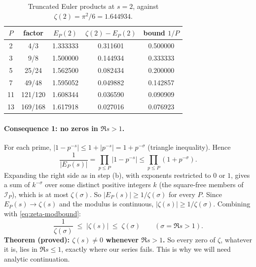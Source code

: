 \begin{table}[htbp]\centering
\caption{Truncated Euler products at $s=2$, against $\zeta(2)=\pi^2/6=1.644934$.}
\label{tab:zeta-euler}
\begin{tabular}{ccccc}
\toprule
$P$ & factor & $E_P(2)$ & $\zeta(2)-E_P(2)$ & bound $1/P$\\
\midrule
2 & 4/3 & 1.333333 & 0.311601 & 0.500000\\
3 & 9/8 & 1.500000 & 0.144934 & 0.333333\\
5 & 25/24 & 1.562500 & 0.082434 & 0.200000\\
7 & 49/48 & 1.595052 & 0.049882 & 0.142857\\
11 & 121/120 & 1.608344 & 0.036590 & 0.090909\\
13 & 169/168 & 1.617918 & 0.027016 & 0.076923\\
\bottomrule
\end{tabular}
\end{table}

\paragraph{Consequence 1: no zeros in $\Re s>1$.} For each prime, $|1-p^{-s}|\le1+|p^{-s}|=1+p^{-\sigma}$ (triangle inequality). Hence
\[
\frac{1}{|E_P(s)|}=\prod_{p\le P}|1-p^{-s}|\le\prod_{p\le P}(1+p^{-\sigma}).
\]
Expanding the right side as in step (b), with exponents restricted to $0$ or $1$, gives a sum of $k^{-\sigma}$ over some distinct positive integers $k$ (the square-free members of $\mathcal{I}_P$), which is at most $\zeta(\sigma)$. So $|E_P(s)|\ge1/\zeta(\sigma)$ for every $P$. Since $E_P(s)\to\zeta(s)$ and the modulus is continuous, $|\zeta(s)|\ge1/\zeta(\sigma)$. Combining with \cref{eq:zeta-modbound}:
\begin{equation}
\frac{1}{\zeta(\sigma)}\;\le\;|\zeta(s)|\;\le\;\zeta(\sigma)\qquad(\sigma=\Re s>1).
\label{eq:zeta-lowerbound}
\end{equation}
\textbf{Theorem (proved): $\zeta(s)\neq0$ whenever $\Re s>1$.} So every zero of $\zeta$, whatever it is, lies in $\Re s\le1$, exactly where our series fails. This is why we will need analytic continuation.

